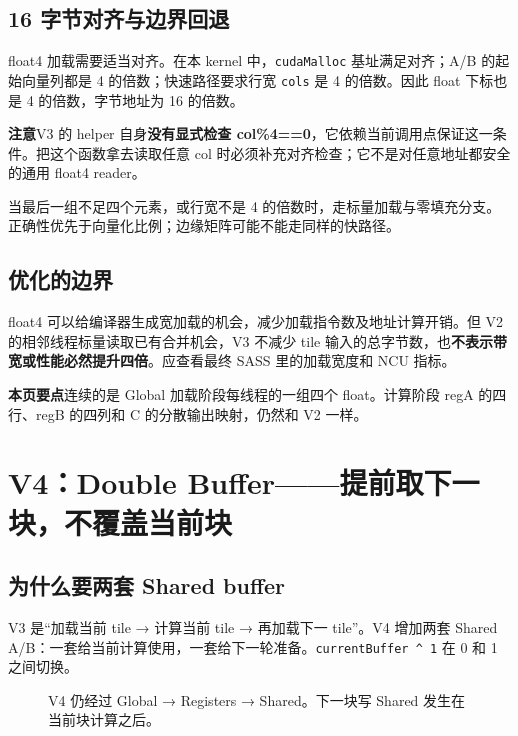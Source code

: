 \documentclass[UTF8,11pt,a4paper,fontset=fandol]{ctexart}
\newcommand{\code}[1]{\nolinkurl{#1}}
\newcommand{\takeaway}[1]{\par\noindent\colorbox{PaleBlue}{\parbox{\dimexpr\linewidth-2\fboxsep\relax}{\textbf{本页要点}\quad #1}}\par}
\newcommand{\caution}[1]{\par\noindent\colorbox{PaleOrange}{\parbox{\dimexpr\linewidth-2\fboxsep\relax}{\textbf{注意}\quad #1}}\par}
\newcommand{\pagebreakhere}{\clearpage}
\begin{document}
\subsection{16 字节对齐与边界回退}
float4 加载需要适当对齐。在本 kernel 中，\code{cudaMalloc} 基址满足对齐；A/B 的起始向量列都是 4 的倍数；快速路径要求行宽 \code{cols} 是 4 的倍数。因此 float 下标也是 4 的倍数，字节地址为 16 的倍数。

\caution{V3 的 helper 自身\textbf{没有显式检查 col\%4==0}，它依赖当前调用点保证这一条件。把这个函数拿去读取任意 col 时必须补充对齐检查；它不是对任意地址都安全的通用 float4 reader。}
当最后一组不足四个元素，或行宽不是 4 的倍数时，走标量加载与零填充分支。正确性优先于向量化比例；边缘矩阵可能不能走同样的快路径。

\subsection{优化的边界}
float4 可以给编译器生成宽加载的机会，减少加载指令数及地址计算开销。但 V2 的相邻线程标量读取已有合并机会，V3 不减少 tile 输入的总字节数，也\textbf{不表示带宽或性能必然提升四倍}。应查看最终 SASS 里的加载宽度和 NCU 指标。
\takeaway{连续的是 Global 加载阶段每线程的一组四个 float。计算阶段 regA 的四行、regB 的四列和 C 的分散输出映射，仍然和 V2 一样。}
\pagebreakhere

\section{V4：Double Buffer——提前取下一块，不覆盖当前块}
\subsection{为什么要两套 Shared buffer}
V3 是“加载当前 tile → 计算当前 tile → 再加载下一 tile”。V4 增加两套 Shared A/B：一套给当前计算使用，一套给下一轮准备。\code{currentBuffer ^ 1} 在 0 和 1 之间切换。

\begin{figure}[H]\centering
{}
\caption{V4 仍经过 Global → Registers → Shared。下一块写 Shared 发生在当前块计算之后。}
\end{figure}
\end{document}
